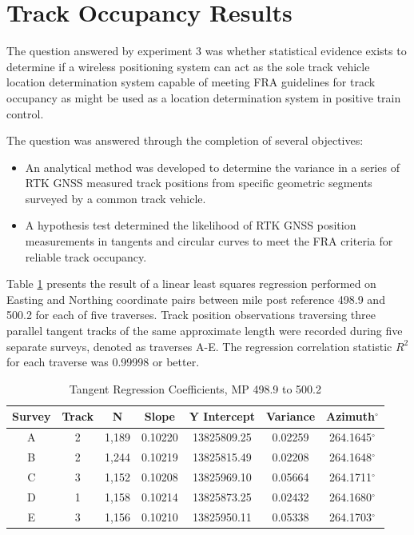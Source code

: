 
\section{Track Occupancy Results}
The question answered by experiment 3 was whether statistical evidence exists to determine if a wireless positioning system can act as the sole track vehicle location determination system capable of meeting FRA guidelines for track occupancy as might be used as a location determination system in positive train control.

The question was answered through the completion of several objectives:
\begin{itemize}
\item An analytical method was developed to determine the variance in a series of RTK GNSS measured track positions from specific geometric segments surveyed by a common track vehicle.
\item A hypothesis test determined the likelihood of RTK GNSS position measurements in tangents and circular curves to meet the FRA criteria for reliable track occupancy.
\end{itemize}

Table \ref{tab:tanRegress} presents the result of a linear least squares regression performed on Easting and Northing coordinate pairs between mile post reference 498.9 and 500.2 for each of five traverses. Track position observations traversing three parallel tangent tracks of the same approximate length were recorded during five separate surveys, denoted as traverses A-E. The regression correlation statistic ${R^2}$ for each traverse was 0.99998 or better.

\begin{table}[!h]
	\begin{center}
	\caption{Tangent Regression Coefficients, MP 498.9 to 500.2}
	\label{tab:tanRegress}
		\begin{tabular}{c c c c c c c}
\toprule
	Survey & Track & N  & Slope  & Y Intercept & Variance & Azimuth$^{\circ}$\\
\midrule
	A & 2 & 1,189 & 0.10220 & 13825809.25 & 0.02259 & 264.1645$^{\circ}$\\
	B & 2 & 1,244 & 0.10219 & 13825815.49 & 0.02208 & 264.1648$^{\circ}$\\
	C & 3 & 1,152 & 0.10208 & 13825969.10 & 0.05664 & 264.1711$^{\circ}$\\
	D & 1 & 1,158 & 0.10214 & 13825873.25 & 0.02432 & 264.1680$^{\circ}$\\
	E & 3 & 1,156 & 0.10210 & 13825950.11 & 0.05338 & 264.1703$^{\circ}$\\
	\bottomrule
	\end{tabular}
	\end{center}
\end{table}

